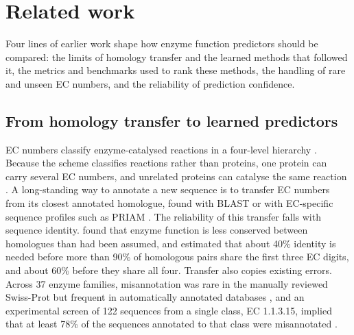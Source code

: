 %
%

\section{Related work}\label{sec:related}

Four lines of earlier work shape how enzyme function predictors should be compared: the limits of homology transfer and the learned methods that followed it, the metrics and benchmarks used to rank these methods, the handling of rare and unseen EC numbers, and the reliability of prediction confidence.

\subsection{From homology transfer to learned predictors}\label{sec:related:methods}

EC numbers classify enzyme-catalysed reactions in a four-level hierarchy \citep{McDonald2023}. Because the scheme classifies reactions rather than proteins, one protein can carry several EC numbers, and unrelated proteins can catalyse the same reaction \citep{Omelchenko2010}. A long-standing way to annotate a new sequence is to transfer EC numbers from its closest annotated homologue, found with BLAST \citep{Altschul1997,Camacho2009} or with EC-specific sequence profiles such as PRIAM \citep{ClaudelRenard2003}. The reliability of this transfer falls with sequence identity. \citet{Rost2002} found that enzyme function is less conserved between homologues than had been assumed, and \citet{Tian2003} estimated that about 40\% identity is needed before more than 90\% of homologous pairs share the first three EC digits, and about 60\% before they share all four. Transfer also copies existing errors. Across 37 enzyme families, misannotation was rare in the manually reviewed Swiss-Prot but frequent in automatically annotated databases \citep{Schnoes2009}, and an experimental screen of 122 sequences from a single class, EC 1.1.3.15, implied that at least 78\% of the sequences annotated to that class were misannotated \citep{Rembeza2021}.

